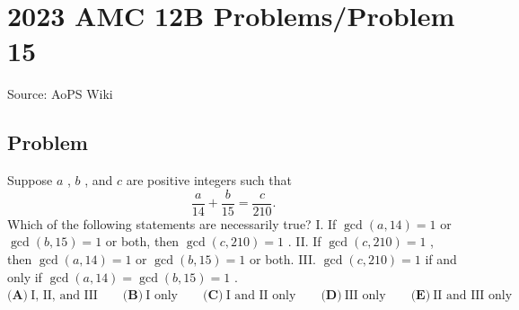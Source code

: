\documentclass[12pt]{article}
\begin{document}
\section*{{2023 AMC 12B Problems/Problem 15}}
Source: AoPS Wiki

\subsection*{Problem}
Suppose $a$ , $b$ , and $c$ are positive integers such that \[\frac{a}{14}+\frac{b}{15}=\frac{c}{210}.\] Which of the following statements are necessarily true? I. If $\gcd(a,14)=1$ or $\gcd(b,15)=1$ or both, then $\gcd(c,210)=1$ . II. If $\gcd(c,210)=1$ , then $\gcd(a,14)=1$ or $\gcd(b,15)=1$ or both. III. $\gcd(c,210)=1$ if and only if $\gcd(a,14)=\gcd(b,15)=1$ . $\textbf{(A)}~\text{I, II, and III}\qquad\textbf{(B)}~\text{I only}\qquad\textbf{(C)}~\text{I and II only}\qquad\textbf{(D)}~\text{III only}\qquad\textbf{(E)}~\text{II and III only}$
\end{document}
